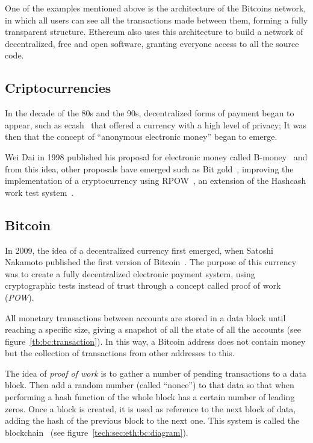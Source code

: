 One of the examples mentioned above is the architecture of the Bitcoins network,
in which all users can see all the transactions made between them, forming a
fully transparent structure. Ethereum also uses this architecture to build a
network of decentralized, free and open software, granting everyone access to
all the source code.

\subsection{Criptocurrencies}
\label{tb:cryptos}
In the decade of the 80s and the 90s, decentralized forms of payment began to
appear, such as ecash~\cite{chaum1995introduction} that offered a currency with
a high level of privacy; It was then that the concept of ``anonymous electronic
money'' began to emerge.

Wei Dai in 1998 published his proposal for electronic money called
B-money~\cite{bmoney} and from this idea, other proposals have emerged such as
Bit gold~\cite{bitgold}, improving the implementation of a cryptocurrency using
RPOW~\cite{finney2005rpow}, an extension of the Hashcash work test
system~\cite{back2002hashcash}.

\subsection{Bitcoin}
\label{tb:bc}


In 2009, the idea of a decentralized currency first emerged, when Satoshi
Nakamoto published the first version of Bitcoin~\cite{nakamoto2008bitcoin}. The
purpose of this currency was to create a fully decentralized electronic payment
system, using cryptographic tests instead of trust through a concept called
proof of work (\emph{POW}).

All monetary transactions between accounts are stored in a data block until
reaching a specific size, giving a snapshot of all the state of all the accounts
(see figure~\ref{tb:bc:transaction}). In this way, a Bitcoin address does not
contain money but the collection of transactions from other addresses to this.

The idea of \emph{proof of work} is to gather a number of pending transactions
to a data block. Then add a random number (called ``nonce'') to that data so
that when performing a hash function of the whole block has a certain number of
leading zeros. Once a block is created, it is used as reference to the next
block of data, adding the hash of the previous block to the next one. This
system is called the blockchain~\cite{antonopoulos2014mastering} (see
figure~\ref{tech:sec:eth:bc:diagram}).

